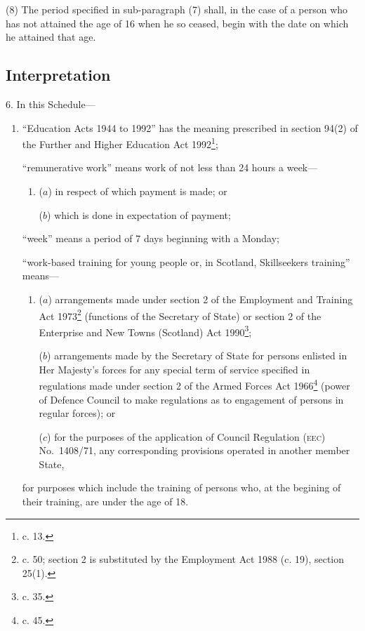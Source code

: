 \documentclass[a4paper,12pt]{article}
\begin{document}
(8) The period specified in sub-paragraph (7) shall, in the case of a person who has not attained the age of 16 when he so ceased, begin with the date on which he attained that age.

\subsection*{Interpretation}

6.  In this Schedule—
\begin{enumerate}\item[]
“Education Acts 1944 to 1992” has the meaning prescribed in section 94(2) of the Further and Higher Education Act 1992\footnote{ c. 13.};

“remunerative work” means work of not less than 24 hours a week—
\begin{enumerate}\item[]
($a$) in respect of which payment is made; or

($b$) which is done in expectation of payment;
\end{enumerate}

“week” means a period of 7 days beginning with a Monday;

“work-based training for young people or, in Scotland, Skillseekers training”  %
means—
\begin{enumerate}\item[]
($a$) arrangements made under section 2 of the Employment and Training Act 1973\footnote{ c. 50; section 2 is substituted by the Employment Act 1988 (c. 19), section 25(1).} (functions of the Secretary of State) or section 2 of the Enterprise and New Towns (Scotland) Act 1990\footnote{ c. 35.};

($b$) arrangements made by the Secretary of State for persons enlisted in Her Majesty’s forces for any special term of service specified in regulations made under section 2 of the Armed Forces Act 1966\footnote{ c. 45.} (power of Defence Council to make regulations as to engagement of persons in regular forces); or

($c$) for the purposes of the application of Council Regulation \textsc{\lowercase{(EEC)}} No.\ 1408/71, any corresponding provisions operated in another member State,
\end{enumerate}
for purposes which include the training of persons who, at the begining of their training, are under the age of 18.
\end{enumerate}
\end{document}
